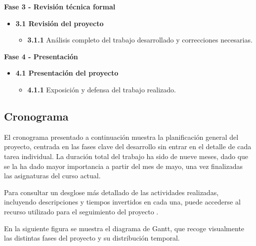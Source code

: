 \documentclass[a4paper, 10pt]{article}
\begin{document}
\vspace{0.5cm}
\textbf{\large Fase 3 - Revisión técnica formal} \vspace{0.5cm}

\begin{itemize}
    \item \textbf{3.1 Revisión del proyecto}
    \begin{itemize}
        \item \textbf{3.1.1} Análisis completo del trabajo desarrollado y correcciones necesarias.
    \end{itemize}
\end{itemize}

\vspace{0.5cm}
\textbf{\large Fase 4 - Presentación} \vspace{0.5cm}

\begin{itemize}
    \item \textbf{4.1 Presentación del proyecto}
    \begin{itemize}
        \item \textbf{4.1.1} Exposición y defensa del trabajo realizado.
    \end{itemize}
\end{itemize}


\subsection{Cronograma}

El cronograma presentado a continuación  muestra la planificación general del proyecto, centrada en las fases clave del desarrollo sin entrar 
en el detalle de cada tarea individual. La duración total del trabajo ha sido de nueve meses, dado que se la ha dado mayor importancia a 
partir del mes de mayo, una vez finalizadas las asignaturas del curso actual.
\par\vspace{0.5cm}
Para consultar un desglose más detallado de las actividades realizadas, incluyendo descripciones y tiempos invertidos en cada una, 
puede accederse al recurso utilizado para el seguimiento del proyecto \cite{clockify}.
\par\vspace{0.5cm}

En la siguiente figura se muestra el diagrama de Gantt, que recoge visualmente las distintas fases del proyecto y su distribución temporal.
\end{document}
